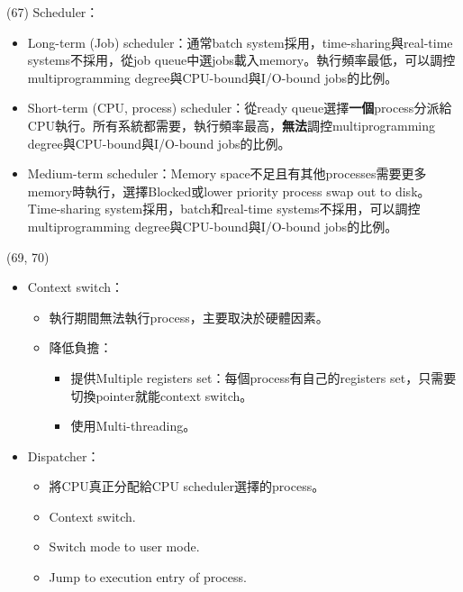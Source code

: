 \item \begin{theorem}{(67)} Scheduler：\begin{itemize}
        \item Long-term (Job) scheduler：通常batch system採用，time-sharing與real-time systems不採用，從job queue中選jobs載入memory。執行頻率最低，可以調控multiprogramming degree與CPU-bound與I/O-bound jobs的比例。
        \item Short-term (CPU, process) scheduler：從ready queue選擇\textbf{一個}process分派給CPU執行。所有系統都需要，執行頻率最高，\textbf{無法}調控multiprogramming degree與CPU-bound與I/O-bound jobs的比例。
        \item Medium-term scheduler：Memory space不足且有其他processes需要更多memory時執行，選擇Blocked或lower priority process swap out to disk。Time-sharing system採用，batch和real-time systems不採用，可以調控multiprogramming degree與CPU-bound與I/O-bound jobs的比例。
    \end{itemize}
\end{theorem}

\item \begin{theorem}{(69, 70)} \quad\quad \begin{itemize}
        \item Context switch：\begin{itemize}
            \item 執行期間無法執行process，主要取決於硬體因素。
            \item 降低負擔：\begin{itemize}
                \item 提供Multiple registers set：每個process有自己的registers set，只需要切換pointer就能context switch。
                \item 使用Multi-threading。
            \end{itemize}
        \end{itemize}
        \item Dispatcher：\begin{itemize}
            \item 將CPU真正分配給CPU scheduler選擇的process。
            \item Context switch.
            \item Switch mode to user mode.
            \item Jump to execution entry of process.
        \end{itemize}
    \end{itemize}
\end{theorem}

